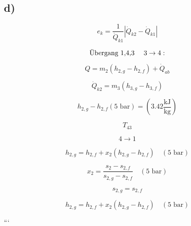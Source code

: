 

\subsection*{d)}

\[
e_k = \frac{1}{\dot{Q}_{k1}} \left| \dot{Q}_{k2} - \dot{Q}_{k1} \right|
\]

\[
\text{Übergang 1,4,3 \quad 3} \rightarrow 4:
\]

\[
Q = m_2 (h_{2,g} - h_{2,f}) + \dot{Q}_{ab}
\]

\[
\dot{Q}_{k2} = m_3 (h_{3,g} - h_{3,f})
\]

\[
h_{2,g} - h_{2,f} \left( 5 \text{ bar} \right) = (3.42 \frac{\text{kJ}}{\text{kg}})
\]

\[
T_{43}
\]

\[
4 \rightarrow 1
\]

\[
h_{2,g} = h_{2,f} + x_{2} (h_{2,g} - h_{2,f}) \quad (5 \text{ bar})
\]

\[
x_2 = \frac{s_2 - s_{2,f}}{s_{2,g} - s_{2,f}} \quad (5 \text{ bar})
\]

\[
s_{2,g} = s_{2,f}
\]

\[
h_{2,g} = h_{2,f} + x_{2} (h_{2,g} - h_{2,f}) \quad (5 \text{ bar})
\]

```